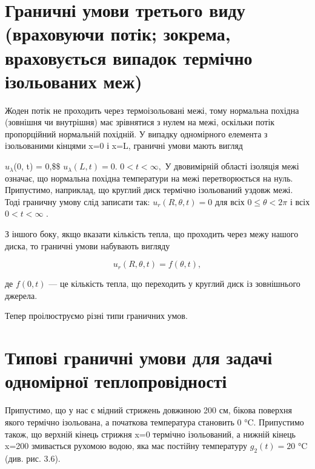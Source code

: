 \documentclass[
  ukrainian,
]{article}
\begin{document}
\section{Граничні умови третього виду (враховуючи потік; зокрема,
враховується випадок термічно ізольованих
меж)}\label{ux433ux440ux430ux43dux438ux447ux43dux456-ux443ux43cux43eux432ux438-ux442ux440ux435ux442ux44cux43eux433ux43e-ux432ux438ux434ux443-ux432ux440ux430ux445ux43eux432ux443ux44eux447ux438-ux43fux43eux442ux456ux43a-ux437ux43eux43aux440ux435ux43cux430-ux432ux440ux430ux445ux43eux432ux443ux454ux442ux44cux441ux44f-ux432ux438ux43fux430ux434ux43eux43a-ux442ux435ux440ux43cux456ux447ux43dux43e-ux456ux437ux43eux43bux44cux43eux432ux430ux43dux438ux445-ux43cux435ux436}

Жоден потік не проходить через термоізольовані межі, тому нормальна
похідна (зовнішня чи внутрішня) має зрівнятися з нулем на межі, оскільки
потік пропорційний нормальній похідній. У випадку одномірного елемента з
ізольованими кінцями x=0 і x=L, граничні умови мають вигляд

\(u_{\lambda}\)(0, t) = 0,\$\$ \(u_{\lambda}(L, t) = 0.\)
\(0 < t < \infty,\) У двовимірній області ізоляція межі означає, що
нормальна похідна температури на межі перетворюється на нуль.
Припустимо, наприклад, що круглий диск термічно ізольований уздовж межі.
Тоді граничну умову слід записати так: \(u_r(R, \theta, t) = 0\) для
всіх \(0 \le \theta < 2\pi\) і всіх \(0 < t < \infty\) .

З іншого боку, якщо вказати кількість тепла, що проходить через межу
нашого диска, то граничні умови набувають вигляду

\[
u_r(R, \theta, t) = f(\theta, t),
\]

де \(f(0, t)\) --- це кількість тепла, що переходить у круглий диск із
зовнішнього джерела.

Тепер проілюструємо різні типи граничних умов.

\section{Типові граничні умови для задачі одномірної
теплопровідності}\label{ux442ux438ux43fux43eux432ux456-ux433ux440ux430ux43dux438ux447ux43dux456-ux443ux43cux43eux432ux438-ux434ux43bux44f-ux437ux430ux434ux430ux447ux456-ux43eux434ux43dux43eux43cux456ux440ux43dux43eux457-ux442ux435ux43fux43bux43eux43fux440ux43eux432ux456ux434ux43dux43eux441ux442ux456}

Припустимо, що у нас є мідний стрижень довжиною 200 см, бікова поверхня
якого термічно ізольована, а початкова температура становить 0 °C.
Припустимо також, що верхній кінець стрижня x=0 термічно ізольований, а
нижній кінець x=200 змивається рухомою водою, яка має постійну
температуру \(g_2(t)=20\) °C (див. рис. 3.6).
\end{document}
